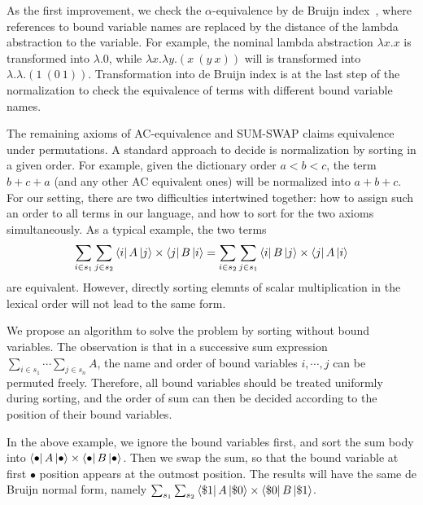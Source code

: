\documentclass[runningheads]{llncs}
\begin{document}
As the first improvement, we check the $\alpha$-equivalence by de Bruijn index~\cite{deBruijn1972lambda}, where references to bound variable names are replaced by the distance of the lambda abstraction to the variable. For example, the nominal lambda abstraction $\lambda x. x$ is transformed into $\lambda . 0$, while $\lambda x. \lambda y. (x\ (y\ x))$ will is transformed into $\lambda.\lambda. (1\ (0\ 1))$. 
Transformation into de Bruijn index is at the last step of the normalization to check the equivalence of terms with different bound variable names.

The remaining axioms of AC-equivalence and SUM-SWAP claims equivalence under permutations.
A standard approach to decide is normalization by sorting in a given order. For example, given the dictionary order $a < b < c$, the term $b + c + a$ (and any other AC equivalent ones) will be normalized into $a + b + c$. For our setting, there are two difficulties intertwined together: how to assign such an order to all terms in our language, and how to sort for the two axioms simultaneously.
As a typical example, the two terms 
\[
    \sum_{i \in s_1} \sum_{j \in s_2} \bra{i}A\ket{j} \times \bra{j}B\ket{i}
    = 
    \sum_{i \in s_2} \sum_{j \in s_1} \bra{i}B\ket{j} \times \bra{j}A\ket{i}
\]
are equivalent. However, directly sorting elemnts of scalar multiplication in the lexical order will not lead to the same form.

We propose an algorithm to solve the problem by sorting without bound variables. The observation is that in a successive sum expression $\sum_{i \in s_1}\cdots\sum_{j \in s_n}A$, the name and order of bound variables $i, \cdots, j$ can be permuted freely. Therefore, all bound variables should be treated uniformly during sorting, and the order of sum can then be decided according to the position of their bound variables.

In the above example, we ignore the bound variables first, and sort the sum body into $\bra{\bullet}A\ket{\bullet} \times \bra{\bullet}B\ket{\bullet}$. Then we swap the sum, so that the bound variable at first $\bullet$ position appears at the outmost position. The results will have the same de Bruijn normal form, namely $\sum_{s_1} \sum_{s_2} \bra{\$1} A \ket{\$0} \times \bra{\$0} B \ket{\$1}$.
\end{document}
